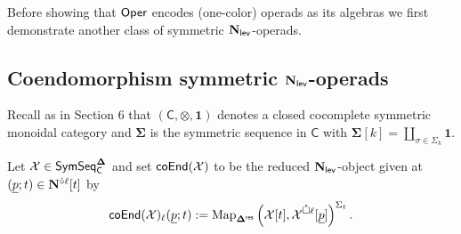 Before showing that $\mathsf{Oper}$ encodes (one-color) operads as its algebras we first demonstrate another class of symmetric $\mathbf{N}_{\mathsf{lev}}$-operads. 

\subsection{Coendomorphism symmetric $\mathbf{N}_{\mathsf{lev}}$-operads}
Recall as in Section 6 that $(\mathsf{C}, \otimes, \mathbf{1})$ denotes a closed cocomplete symmetric monoidal category and $\mathbf{\Sigma}$ is the symmetric sequence in $\mathsf{C}$ with $\mathbf{\Sigma}[k]=\coprod_{\sigma\in \Sigma_k} \mathbf{1}.$
\begin{definition} \label{def:coend}
    Let $\mathcal{X}\in \mathsf{SymSeq}_{\mathsf{C}}^{\mathbf{\Delta}}$ and set $\mathsf{coEnd}(\mathcal{X})$ to be the reduced  $\mathbf{N}_{\mathsf{lev}}$-object given at $(\underline{p};t)\in \mathbf{N}^{\hat{\circ}\ell}[t]$ by \[ \mathsf{coEnd}(\mathcal{X})_{\ell}(\underline{p};t):= \operatorname{Map}_{\mathbf{\Delta}^{\mathsf{res}}} \left( \mathcal{X}[t] , \mathcal{X}^{\mathring{\square} \ell} [\underline{p}] \right)^{\Sigma_t}.\]
\end{definition}

